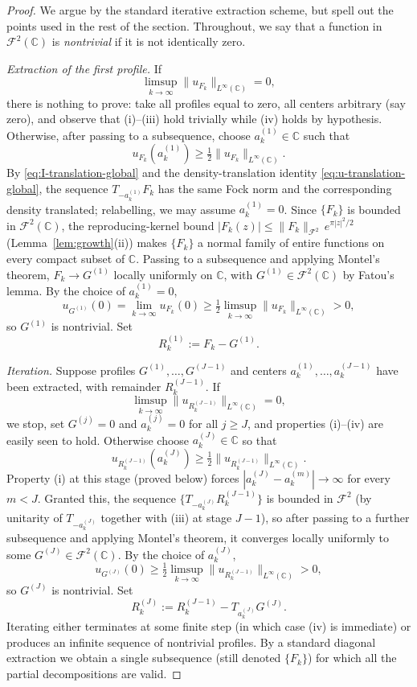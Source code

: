 \documentclass[a4paper,11pt,reqno]{amsart}
\numberwithin{equation}{section}
\theoremstyle{plain} %
\theoremstyle{definition} %
\theoremstyle{remark}
\newcommand{\C}{\mathbb{C}}
\begin{document}
\begin{proof}
We argue by the standard iterative extraction scheme, but spell out the points
used in the rest of the section. Throughout, we say that a function in
\(\mathcal F^2(\C)\) is \emph{nontrivial} if it is not identically zero.

\medskip
\noindent\emph{Extraction of the first profile.}
If
\[
\limsup_{k\to\infty}\|u_{F_k}\|_{L^\infty(\C)}=0,
\]
there is nothing to prove: take all profiles equal to zero, all centers
arbitrary (say zero), and observe that (i)--(iii) hold trivially while (iv)
holds by hypothesis. Otherwise, after passing to a subsequence, choose
\(a_k^{(1)}\in \C\) such that
\[
u_{F_k}(a_k^{(1)})\ge \tfrac12\|u_{F_k}\|_{L^\infty(\C)}.
\]
By \eqref{eq:I-translation-global} and the density-translation identity
\eqref{eq:u-translation-global}, the sequence \(T_{-a_k^{(1)}}F_k\) has the
same Fock norm and the corresponding density translated; relabelling, we may
assume \(a_k^{(1)}=0\). Since \(\{F_k\}\) is bounded in \(\mathcal F^2(\C)\),
the reproducing-kernel bound \(|F_k(z)|\le \|F_k\|_{\mathcal F^2}\,
e^{\pi |z|^2/2}\) (Lemma~\ref{lem:growth}(ii)) makes \(\{F_k\}\) a normal
family of entire functions on every compact subset of \(\C\). Passing to a
subsequence and applying Montel's theorem, \(F_k\to G^{(1)}\) locally
uniformly on \(\C\), with \(G^{(1)}\in\mathcal F^2(\C)\) by Fatou's lemma. By
the choice of \(a_k^{(1)}=0\),
\[
u_{G^{(1)}}(0)=\lim_{k\to\infty}u_{F_k}(0)
\ge \tfrac12 \limsup_{k\to\infty}\|u_{F_k}\|_{L^\infty(\C)}>0,
\]
so \(G^{(1)}\) is nontrivial. Set
\[
R_k^{(1)}:=F_k-G^{(1)}.
\]

\medskip
\noindent\emph{Iteration.}
Suppose profiles \(G^{(1)},\dots,G^{(J-1)}\) and centers
\(a_k^{(1)},\dots,a_k^{(J-1)}\) have been extracted, with remainder
\(R_k^{(J-1)}\). If
\[
\limsup_{k\to\infty}\|u_{R_k^{(J-1)}}\|_{L^\infty(\C)}=0,
\]
we stop, set \(G^{(j)}=0\) and \(a_k^{(j)}=0\) for all \(j\ge J\), and
properties (i)--(iv) are easily seen to hold. Otherwise choose
\(a_k^{(J)}\in\C\) so that
\[
u_{R_k^{(J-1)}}(a_k^{(J)})
\ge \tfrac12\|u_{R_k^{(J-1)}}\|_{L^\infty(\C)}.
\]
Property (i) at this stage (proved below) forces
\(|a_k^{(J)}-a_k^{(m)}|\to\infty\) for every \(m<J\). Granted this, the
sequence \(\{T_{-a_k^{(J)}}R_k^{(J-1)}\}\) is bounded in \(\mathcal F^2\) (by
unitarity of \(T_{-a_k^{(J)}}\) together with (iii) at stage \(J-1\)), so
after passing to a further subsequence and applying Montel's theorem, it
converges locally uniformly to some \(G^{(J)}\in\mathcal F^2(\C)\). By the
choice of \(a_k^{(J)}\),
\[
u_{G^{(J)}}(0)
\ge \tfrac12 \limsup_{k\to\infty}\|u_{R_k^{(J-1)}}\|_{L^\infty(\C)}>0,
\]
so \(G^{(J)}\) is nontrivial. Set
\[
R_k^{(J)}:=R_k^{(J-1)}-T_{a_k^{(J)}}G^{(J)}.
\]
Iterating either terminates at some finite step (in which case (iv) is
immediate) or produces an infinite sequence of nontrivial profiles. By a
standard diagonal extraction we obtain a single subsequence (still denoted
\(\{F_k\}\)) for which all the partial decompositions are valid.


\end{proof}
\end{document}
